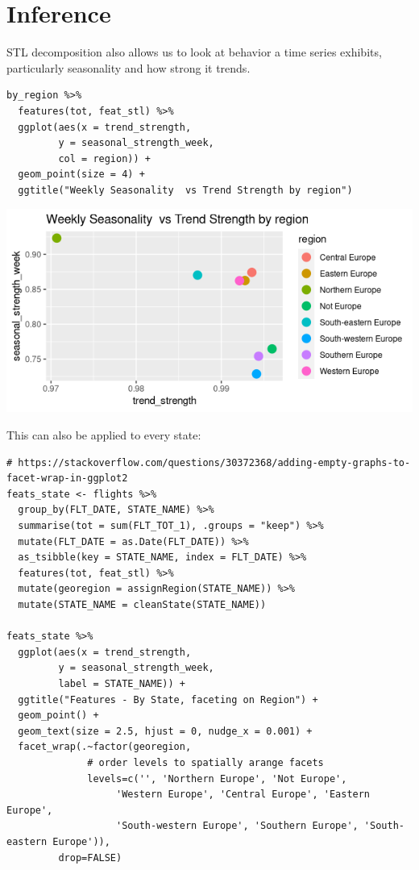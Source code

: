 \documentclass[8pt]{article}
\begin{document}
\begin{latex}
\pagebreak
\end{latex}
\section{Inference}
\label{sec:org1a1f9ac}
STL decomposition also allows us to look at behavior a time series exhibits, particularly seasonality and how strong it trends.

\begin{verbatim}
by_region %>%
  features(tot, feat_stl) %>%
  ggplot(aes(x = trend_strength,
	     y = seasonal_strength_week,
	     col = region)) +
  geom_point(size = 4) +
  ggtitle("Weekly Seasonality  vs Trend Strength by region")
\end{verbatim}

\begin{center}
\includegraphics[width=.9\linewidth]{./media/feat_region.png}
\end{center}

\begin{latex}
\pagebreak
\end{latex}

This can also be applied to every state:

\begin{verbatim}
# https://stackoverflow.com/questions/30372368/adding-empty-graphs-to-facet-wrap-in-ggplot2
feats_state <- flights %>%
  group_by(FLT_DATE, STATE_NAME) %>%
  summarise(tot = sum(FLT_TOT_1), .groups = "keep") %>%
  mutate(FLT_DATE = as.Date(FLT_DATE)) %>%
  as_tsibble(key = STATE_NAME, index = FLT_DATE) %>%
  features(tot, feat_stl) %>%
  mutate(georegion = assignRegion(STATE_NAME)) %>%
  mutate(STATE_NAME = cleanState(STATE_NAME))

feats_state %>%
  ggplot(aes(x = trend_strength,
	     y = seasonal_strength_week,
	     label = STATE_NAME)) +
  ggtitle("Features - By State, faceting on Region") +
  geom_point() +
  geom_text(size = 2.5, hjust = 0, nudge_x = 0.001) +
  facet_wrap(.~factor(georegion,
		      # order levels to spatially arange facets
		      levels=c('', 'Northern Europe', 'Not Europe',
			       'Western Europe', 'Central Europe', 'Eastern Europe',
			       'South-western Europe', 'Southern Europe', 'South-eastern Europe')),
	     drop=FALSE)

\end{verbatim}
\end{document}
